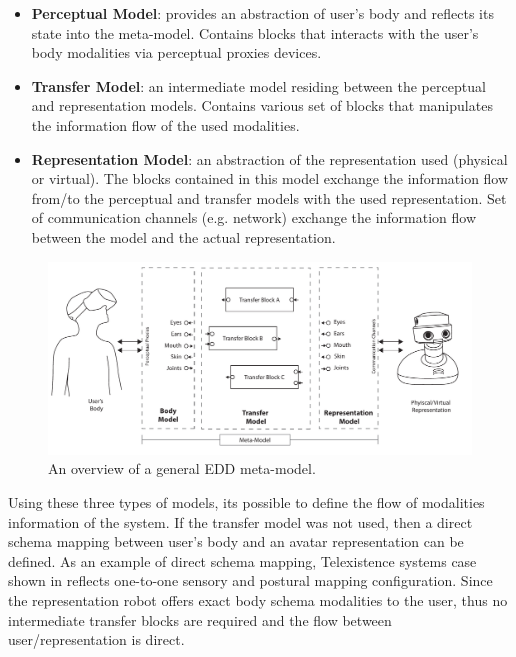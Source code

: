 \begin{itemize}
  \setlength\itemsep{0em}
\item \textbf{Perceptual Model}: provides an abstraction of user's body and reflects its state into the meta-model. Contains blocks that interacts with the user's body modalities via perceptual proxies devices.
\item \textbf{Transfer Model}: an intermediate model residing between the perceptual and representation models. Contains various set of blocks that manipulates the information flow of the used modalities.
\item \textbf{Representation Model}: an abstraction of the representation used (physical or virtual). The blocks contained in this model exchange the information flow from/to the perceptual and transfer models with the used representation. Set of communication channels (e.g. network) exchange the information flow between the model and the actual representation.
\end{itemize}

\begin{figure}[t!]
  \centering
  \includegraphics[width=1\linewidth]{figures/concept/EDD-metamodel.pdf}
  \captionsetup{justification=centering}
  \caption{An overview of a general EDD meta-model.}
  \label{fig:concept-EDD-MetaModel}
\end{figure}

Using these three types of models, its possible to define the flow of modalities information of the system. If the transfer model was not used, then a direct schema mapping between user's body and an avatar representation can be defined. As an example of direct schema mapping, Telexistence systems case shown in  reflects one-to-one sensory and postural mapping configuration. Since the representation robot offers exact body schema modalities to the user, thus no intermediate transfer blocks are required and the flow between user/representation is direct. 

